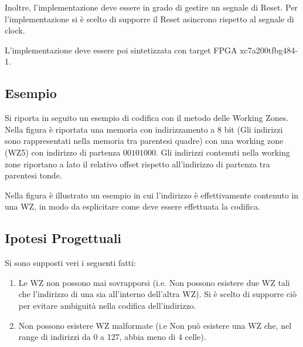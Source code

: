 \documentclass{article}
\begin{document}
Inoltre, l'implementazione deve essere in grado di gestire un segnale di Reset.
Per l'implementazione si è scelto di supporre il Reset asincrono rispetto al segnale di clock.

L'implementazione deve essere poi sintetizzata con target FPGA xc7a200tfbg484-1.

\subsection{Esempio}
Si riporta in seguito un esempio di codifica con il metodo delle Working Zones. Nella figura è riportata una memoria con indirizzamento a 8 bit (Gli indirizzi sono rappresentati nella memoria tra parentesi quadre) con una working zone (WZ5) con indirizzo di partenza $00101000$.
\newpage
Gli indirizzi contenuti nella working zone riportano a lato il relativo offset rispetto all'indirizzo di partenza tra parentesi tonde.

Nella figura è illustrato un esempio in cui l'indirizzo è effettivamente contenuto in una WZ, in modo da esplicitare come deve essere effettuata la codifica.

\vspace*{1cm}
\noindent
{}%
\vspace*{0.5cm}

\subsection{Ipotesi Progettuali}
\label{ipotesi}
Si sono supposti veri i seguenti fatti:
\begin{enumerate}
\item Le WZ non possono mai sovrapporsi (i.e. Non possono esistere due WZ tali che l'indirizzo di una sia all'interno dell'altra WZ). Si è scelto di
supporre ciò per evitare ambiguità nella codifica dell'indirizzo.
\item Non possono esistere WZ malformate (i.e Non può esistere una WZ che, nel range di indirizzi da 0 a 127, abbia meno di 4 celle).
\end{enumerate}
 
\end{document}
